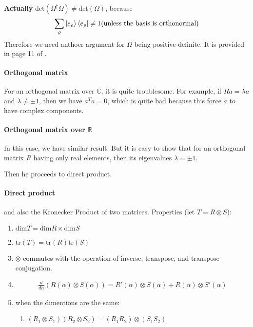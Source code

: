 \documentclass{article}
\numberwithin{equation}{subsection} %
\theoremstyle{definition}
\begin{document}
\textbf{Actually} 
$\text{det}(\Omega^\dagger \Omega)\neq\text{det}(\Omega)$, because
\begin{align}
    \sum_\rho \ket{e_\rho}\bra{e_\rho} \neq 1 \text{(unless the basis is
        orthonormal)}
\end{align}
Therefore we need anthoer argument for $\Omega$ being positive-definite.
It is provided in page 11 of \cite{book}.

\paragraph{Orthogonal matrix} For an orthogonal matrix over $\mathbb{C}$,
it is quite troublesome. For example, if $Ra=\lambda a$ and
$\lambda \neq \pm 1$, then we have $a^T a=0$, which is quite bad because
this force $a$ to have complex components.

\paragraph{Orthogonal matrix over $\mathbb{R}$} In this case, we have
similar result. But it is easy to show that for an orthogonal matrix
$R$ having only real elements, then its eigenvalues $\lambda= \pm 1$.

Then he proceeds to direct product.
\paragraph{Direct product} and also the Kronecker Product of two
matrices. Properties (let $T=R\otimes S$):
\begin{enumerate}
    \item $\mathrm{dim}T = \mathrm{dim}R \times \mathrm{dim}S$
    \item $\mathrm{tr}(T)=\mathrm{tr}(R)\mathrm{tr}(S)$
    \item $\otimes$ commutes with the operation of inverse, transpose,
        and transpose conjugation.
    \item \begin{align}
            \frac{d}{d\alpha} (R(\alpha)\otimes S(\alpha)) =
            R'(\alpha)\otimes S(\alpha) + R(\alpha)\otimes S'(\alpha)
    \end{align}
    \item when the dimentions are the same:
        \begin{enumerate}
            \item 
            $(R_1\otimes S_1)(R_2\otimes S_2) = (R_1R_2)\otimes (S_1S_2)$
        \end{enumerate}
\end{enumerate}
\end{document}
